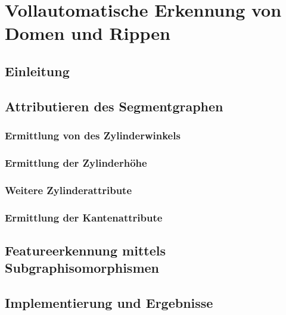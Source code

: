 \chapter{Vollautomatische Erkennung von Domen und Rippen}
\label{cha:psoDomes}
	
\section{Einleitung}

\section{Attributieren des Segmentgraphen}
\subsection{Ermittlung von des Zylinderwinkels}
\subsection{Ermittlung der Zylinderh\"ohe}
\subsection{Weitere Zylinderattribute}
\subsection{Ermittlung der Kantenattribute}

\section{Featureerkennung mittels Subgraphisomorphismen}

\section{Implementierung und Ergebnisse}